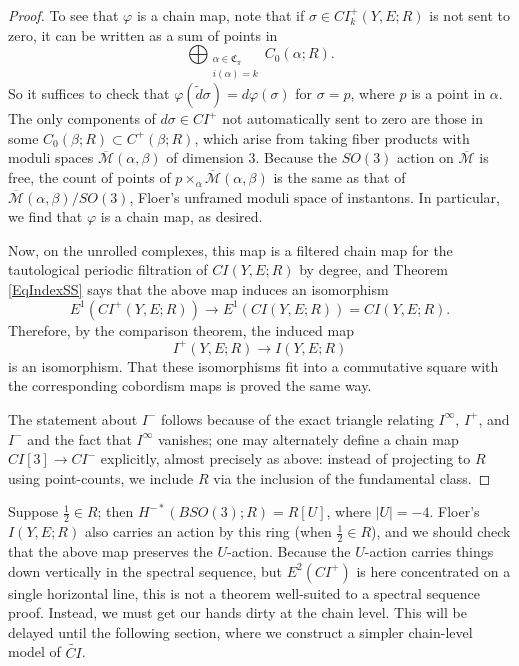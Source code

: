 \documentclass{memo-l}
\theoremstyle{definition}
\theoremstyle{remark}
\numberwithin{section}{chapter}
\numberwithin{equation}{chapter}
\begin{document}
\begin{proof}
To see that $\varphi$ is a chain map, note that if $\sigma \in CI_k^+(Y, E;R)$ is not sent to zero, it can be written as a sum of points in 
$$\bigoplus_{\substack{\alpha \in \mathfrak C_\pi \\ i(\alpha) = k}}C_0(\alpha;R).$$ 
So it suffices to check that $\varphi(\tilde d\sigma) = d\varphi(\sigma)$ for $\sigma = p$, where $p$ is a point in $\alpha$. The only components of $d\sigma \in CI^+$ not automatically sent to zero are those in some $C_0(\beta;R) \subset C^+(\beta;R)$, which arise from taking fiber products with moduli spaces $\overline{\mathcal M}(\alpha, \beta)$ of dimension 3. Because the $SO(3)$ action on $\overline{\mathcal M}$ is free, the count of points of $p \times_\alpha \overline{\mathcal M}(\alpha, \beta)$ is the same as that of $\overline{\mathcal M}(\alpha, \beta)/SO(3)$, Floer's unframed moduli space of instantons. In particular, we find that $\varphi$ is a chain map, as desired.

Now, on the unrolled complexes, this map is a filtered chain map for the tautological periodic filtration of $CI(Y, E;R)$ by degree, and Theorem \ref{EqIndexSS} says that the above map induces an isomorphism $$E^1\left(CI^+(Y, E;R)\right) \to E^1\left(CI(Y, E;R)\right) = CI(Y, E;R).$$ Therefore, by the comparison theorem, the induced map $$I^+(Y, E;R) \to I(Y, E;R)$$ is an isomorphism. That these isomorphisms fit into a commutative square with the corresponding cobordism maps is proved the same way. 

The statement about $I^-$ follows because of the exact triangle relating $I^\infty$, $I^+$, and $I^-$ and the fact that $I^\infty$ vanishes; one may alternately define a chain map $CI[3] \to CI^-$ explicitly, almost precisely as above: instead of projecting to $R$ using point-counts, we include $R$ via the inclusion of the fundamental class.
\end{proof}

Suppose $\frac 12 \in R$; then $H^{-*}(BSO(3);R) = R[U]$, where $|U| = -4$. Floer's $I(Y,E;R)$ also carries an action by this ring (when $\frac 12 \in R$), and we should check that the above map preserves the $U$-action. Because the $U$-action carries things down vertically in the spectral sequence, but $E^2(CI^+)$ is here concentrated on a single horizontal line, this is not a theorem well-suited to a spectral sequence proof. Instead, we must get our hands dirty at the chain level. This will be delayed until the following section, where we construct a simpler chain-level model of $\widetilde{CI}$.
\end{document}
